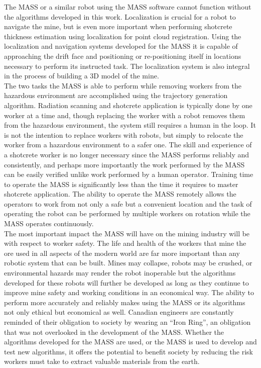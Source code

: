 The MASS or a similar robot using the MASS software cannot function without the algorithms developed in this work. Localization is crucial for a robot to navigate the mine, but is even more important when performing shotcrete thickness estimation using localization for point cloud registration. Using the localization and navigation systems developed for the MASS it is capable of approaching the drift face and positioning or re-positioning itself in locations necessary to perform its instructed task. The localization system is also integral in the process of building a 3D model of the mine.\\

The two tasks the MASS is able to perform while removing workers from the hazardous environment are accomplished using the trajectory generation algorithm. Radiation scanning and shotcrete application is typically done by one worker at a time and, though replacing the worker with a robot removes them from the hazardous environment, the system still requires a human in the loop. It is not the intention to replace workers with robots, but simply to relocate the worker from a hazardous environment to a safer one. The skill and experience of a shotcrete worker is no longer necessary since the MASS performs reliably and consistently, and perhaps more importantly the work performed by the MASS can be easily verified unlike work performed by a human operator. Training time to operate the MASS is significantly less than the time it requires to master shotcrete application. The ability to operate the MASS remotely allows the operators to work from not only a safe but a convenient location and the task of operating the robot can be performed by multiple workers on rotation while the MASS operates continuously.\\

The most important impact the MASS will have on the mining industry will be with respect to worker safety. The life and health of the workers that mine the ore used in all aspects of the modern world are far more important than any robotic system that can be built. Mines may collapse, robots may be crushed, or environmental hazards may render the robot inoperable but the algorithms developed for these robots will further be developed as long as they continue to improve mine safety and working conditions in an economical way. The ability to perform more accurately and reliably makes using the MASS or its algorithms not only ethical but economical as well. Canadian engineers are constantly reminded of their obligation to society by wearing an ``Iron Ring'', an obligation that was not overlooked in the development of the MASS. Whether the algorithms developed for the MASS are used, or the MASS is used to develop and test new algorithms, it offers the potential to benefit society by reducing the risk workers must take to extract valuable materials from the earth.\\


